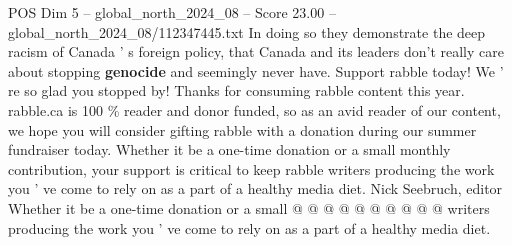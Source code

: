 \begin{textsample}{POS Dim 5 – global\_north\_2024\_08 – Score 23.00 – global\_north\_2024\_08/112347445.txt}
In doing so they demonstrate the deep racism of Canada ' s foreign policy, that Canada and its leaders don't really care about stopping \textbf{genocide} and seemingly never have.
Support rabble today!
We ' re so glad you stopped by!
Thanks for consuming rabble content this year. rabble.ca is 100 \% reader and donor funded, so as an avid reader of our content, we hope you will consider gifting rabble with a donation during our summer fundraiser today.
Whether it be a one-time donation or a small monthly contribution, your support is critical to keep rabble writers producing the work you ' ve come to rely on as a part of a healthy media diet.
Nick Seebruch, editor Whether it be a one-time donation or a small @ @ @ @ @ @ @ @ @ @ writers producing the work you ' ve come to rely on as a part of a healthy media diet.

\end{textsample}
